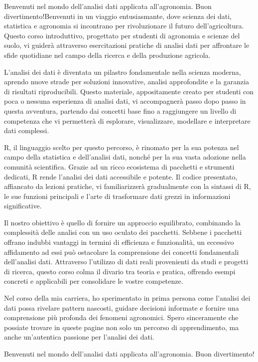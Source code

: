 \documentclass[
]{book}
\begin{document}
Benvenuti nel mondo dell'analisi dati applicata all'agronomia. Buon
divertimento!Benvenuti in un viaggio entusiasmante, dove scienza dei
dati, statistica e agronomia si incontrano per rivoluzionare il futuro
dell'agricoltura. Questo corso introduttivo, progettato per studenti di
agronomia e scienze del suolo, vi guiderà attraverso esercitazioni
pratiche di analisi dati per affrontare le sfide quotidiane nel campo
della ricerca e della produzione agricola.

L'analisi dei dati è diventata un pilastro fondamentale nella scienza
moderna, aprendo nuove strade per soluzioni innovative, analisi
approfondite e la garanzia di risultati riproducibili. Questo materiale,
appositamente creato per studenti con poca o nessuna esperienza di
analisi dati, vi accompagnerà passo dopo passo in questa avventura,
partendo dai concetti base fino a raggiungere un livello di competenza
che vi permetterà di esplorare, visualizzare, modellare e interpretare
dati complessi.

R, il linguaggio scelto per questo percorso, è rinomato per la sua
potenza nel campo della statistica e dell'analisi dati, nonché per la
sua vasta adozione nella comunità scientifica. Grazie ad un ricco
ecosistema di pacchetti e strumenti dedicati, R rende l'analisi dei dati
accessibile e potente. Il codice presentato, affiancato da lezioni
pratiche, vi familiarizzerà gradualmente con la sintassi di R, le sue
funzioni principali e l'arte di trasformare dati grezzi in informazioni
significative.

Il nostro obiettivo è quello di fornire un approccio equilibrato,
combinando la complessità delle analisi con un uso oculato dei
pacchetti. Sebbene i pacchetti offrano indubbi vantaggi in termini di
efficienza e funzionalità, un eccessivo affidamento ad essi può
ostacolare la comprensione dei concetti fondamentali dell'analisi dati.
Attraverso l'utilizzo di dati reali provenienti da studi e progetti di
ricerca, questo corso colma il divario tra teoria e pratica, offrendo
esempi concreti e applicabili per consolidare le vostre competenze.

Nel corso della mia carriera, ho sperimentato in prima persona come
l'analisi dei dati possa rivelare pattern nascosti, guidare decisioni
informate e fornire una comprensione più profonda dei fenomeni
agronomici. Spero sinceramente che possiate trovare in queste pagine non
solo un percorso di apprendimento, ma anche un'autentica passione per
l'analisi dei dati.

Benvenuti nel mondo dell'analisi dati applicata all'agronomia. Buon
divertimento!
\end{document}
